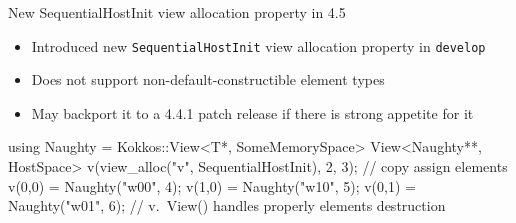 
\begin{frame}[fragile]{New SequentialHostInit view allocation property in 4.5}

\begin{itemize}
\item Introduced new \texttt{SequentialHostInit} view allocation property in \texttt{develop}
\item Does not support non-default-constructible element types
\item May backport it to a 4.4.1 patch release if there is strong appetite for it
\end{itemize}

\begin{code}
using Naughty = Kokkos::View<T*, SomeMemorySpace>
View<Naughty**, HostSpace> v(view_alloc("v", SequentialHostInit), 2, 3);
// copy assign elements
v(0,0) = Naughty("w00", 4);
v(1,0) = Naughty("w10", 5);
v(0,1) = Naughty("w01", 6);
// v.~View() handles properly elements destruction
\end{code}

\end{frame}

